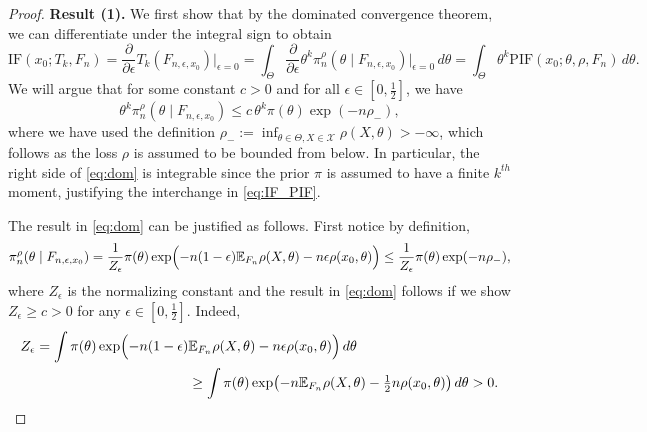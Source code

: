 \documentclass[11pt, oneside]{amsart}
\theoremstyle{definition}   %
\newcommand{\E}{\mathbb{E}}
\newcommand{\loss}{\rho}
\newcommand{\mposterior}{\pi_n^{\loss}}
\begin{document}
\begin{proof}
    \textbf{Result (1).}  We first show that by the dominated convergence theorem, we can differentiate under the integral sign to obtain
    \begin{equation}
    \label{eq:IF_PIF}
        \textrm{IF}(x_0; T_k, F_n) =  \frac{\partial}{\partial \epsilon} T_k ( F_{n,\epsilon,x_0}) \Big |_{\epsilon=0} =
        \int_\Theta  \frac{\partial}{\partial \epsilon} \theta^k \mposterior(\theta \mid F_{n,\epsilon,x_0}) \Big |_{\epsilon=0} \, d\theta =
        \int_\Theta \theta^k \textrm{PIF}(x_0; \theta,\rho, F_n) \, d\theta.
    \end{equation}
    We will argue that for some constant $c>0$ and for all $\epsilon \in [0, \tfrac{1}{2}]$, we have
    \begin{equation}
    \label{eq:dom}
    \theta^k \mposterior(\theta \mid F_{n,\epsilon,x_0}) \leq c \, \theta^k \pi(\theta) \exp(-n \rho_-),
    \end{equation}
    where we have used the definition \( \loss_- := \inf_{\theta \in \Theta, X \in \mathcal{X}} \loss(X, \theta) > -\infty \), which follows as the loss \( \loss \) is assumed to be bounded from below. In particular, the right side of \eqref{eq:dom} is integrable since the prior $\pi$ is assumed to have a finite $k^{th}$ moment, justifying the interchange in \eqref{eq:IF_PIF}.
    
    The result in \eqref{eq:dom} can be justified as follows. First notice by definition,
    \begin{equation}
    \label{eq:dom1} 
    \mposterior(\theta \mid F_{n,\epsilon,x_0}) 
    =
    \frac{1}{Z_\epsilon } \pi(\theta) \exp \Bigl ( -n(1-\epsilon) \E_{F_n} \rho(X, \theta) - n\epsilon\rho(x_0, \theta) \Bigr ) 
    \leq
    \frac{1}{Z_\epsilon } \pi(\theta) \exp(-n \rho_-),
    \end{equation}
    where \( Z_\epsilon\) is the normalizing constant and the result in \eqref{eq:dom} follows if we show $Z_{\epsilon} \geq c > 0$ for any $\epsilon \in [0, \tfrac{1}{2}]$. Indeed,
    \[
    \begin{split}
    Z_\epsilon 
    =
    \int \pi(\theta) \exp  \Bigl( -n(1-\epsilon) &\E_{F_n} \rho(X, \theta) - n\epsilon\rho(x_0, \theta) \Bigr) \, d\theta  \\
    &\geq
    \int \pi(\theta) \exp \bigl ( -n \E_{ F_n} \rho(X, \theta) - \tfrac{1}{2}n \loss(x_0, \theta) \bigr) \, d\theta >0.
    \end{split}
    \]
    

\end{proof}
\end{document}
